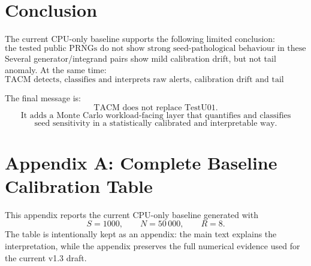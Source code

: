 \documentclass[11pt,a4paper]{article}
\begin{document}
\section{Conclusion}

The current CPU-only baseline supports the following limited conclusion:
\[
\boxed{
\text{the tested public PRNGs do not show strong seed-pathological behaviour in these simple workloads.}
}
\]
Several generator/integrand pairs show mild calibration drift, but not tail anomaly. At the same time:
\[
\boxed{
\text{TACM detects, classifies and interprets raw alerts, calibration drift and tail anomalies.}
}
\]

The final message is:
\[
\boxed{
\text{TACM does not replace TestU01.}
}
\]
\[
\boxed{
\text{It adds a Monte Carlo workload-facing layer that quantifies and classifies}
}
\]
\[
\boxed{
\text{seed sensitivity in a statistically calibrated and interpretable way.}
}
\]

\clearpage
\appendix

\section{Appendix A: Complete Baseline Calibration Table}

This appendix reports the current CPU-only baseline generated with
\[
S=1000,\qquad N=50\,000,\qquad R=8.
\]
The table is intentionally kept as an appendix: the main text explains the interpretation, while the appendix preserves the full numerical evidence used for the current v1.3 draft.
\end{document}
